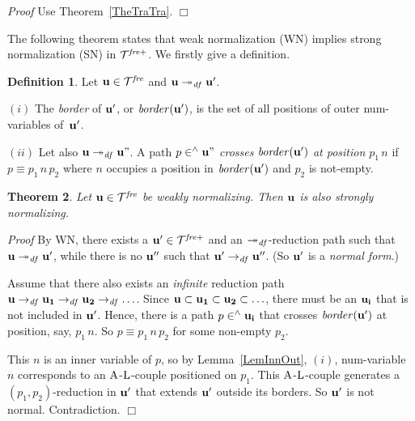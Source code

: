 \documentclass{article}
\theoremstyle{plain}
\newtheorem{The}{Theorem}[section]
\theoremstyle{definition}
\newtheorem{Def}[The]{Definition}
\begin{document}
{{\it Proof\/} Use Theorem~\ref{TheTraTra}. $\Box$

\medskip









The following theorem states that weak normalization (WN) implies strong normalization (SN) in ${\cal T}^{\it fre+}$. We firstly give a definition.

\begin{Def} Let ${\bf u} \in {\cal T}^{\it fre}$ and ${\bf u} \twoheadrightarrow_{\it df} {\bf u'}$.

$(i)$ The {\em border\/} of ${\bf u'}$, or ${\it border}({\bf u'})$, is the set of all positions of outer num-variables of~${\bf u'}$.

$(ii)$ Let also ${\bf u} \twoheadrightarrow_{\it df} {\bf u"}$. A path $p \in^\wedge {\bf u"}$ {\em crosses\/} ${\it border}({\bf u'})$ {\it at position $p_1 \, n$} if $p \equiv p_1 \, n \, p_2$ where $n$ occupies a position in
${\it border}({\bf u'})$ and $p_2$ is not-empty.
\end{Def}

\begin{The}\label{TheWnoSno}
Let ${\bf u} \in {\cal T}^{\it fre}$ be weakly normalizing. Then ${\bf u}$ is also strongly normalizing.
\end{The}

{\it Proof\/} By WN, there exists a ${\bf u'} \in {\cal T}^{\it fre+}$ and an $\twoheadrightarrow_{\it df}$-reduction path such that ${\bf u} \twoheadrightarrow_{\it df} {\bf u'}$, while there is no ${\bf u''}$ such that ${\bf u'} \rightarrow_{\it df} {\bf u''}$. (So ${\bf u'}$ is a {\em normal form}.)

Assume that there also exists an {\em infinite} reduction path ${\bf u} \rightarrow_{\it df} {\bf u_1} \rightarrow_{\it df} {\bf u_2} \rightarrow_{\it df} \ldots$. Since ${\bf u} \subset {\bf u_1} \subset {\bf u_2} \subset \ldots$, there must be an ${\bf u_i}$ that is not included in ${\bf u'}$. Hence, there is a path $p \in^\wedge {\bf u_i}$ that crosses ${\it border\/}({\bf u'})$ at position, say, $p_1 \, n$. So $p \equiv p_1 \, n \, p_2$ for some non-empty $p_2$.

This $n$ is an inner variable of $p$, so by Lemma~\ref{LemInnOut}, $(i)$, num-variable $n$ corresponds to an ${\rm A}$-${\rm L}$-couple positioned on $p_1$. This ${\rm A}$-${\rm L}$-couple generates a $(p_1,p_2)$-reduction in ${\bf u'}$ that extends ${\bf u'}$ outside its borders. So ${\bf u'}$ is not normal. Contradiction. $\Box$

}
\end{document}
